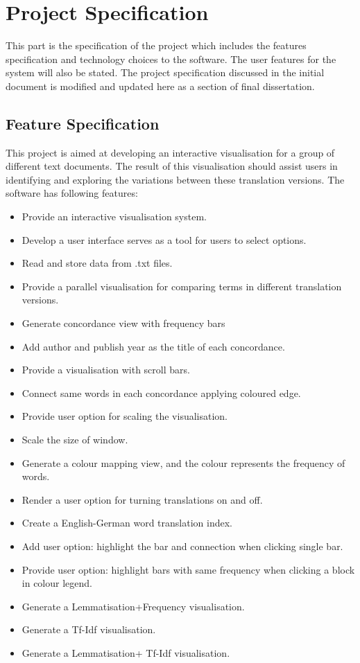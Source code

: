 \clearpage
\section{Project Specification}
This part is the specification of the project which includes the features specification and technology choices to the software. The user features for the system will also be stated. The project specification discussed in the initial document is modified and updated here as a section of final dissertation.

\subsection{Feature Specification}
This project is aimed at developing an interactive visualisation for a group of different text documents. The result of this visualisation should assist users in identifying and exploring the variations between these translation versions. The software has following features:
\begin{itemize}
	\item \textbf{} Provide an interactive visualisation system.
	\item \textbf{} Develop a user interface serves as a tool for users to select options.
	\item \textbf{} Read and store data from .txt files.
	\item \textbf{} Provide a parallel visualisation for comparing terms in different translation versions.
	\item \textbf{} Generate concordance view with frequency bars
	\item \textbf{} Add author and publish year as the title of each concordance.
	\item \textbf{} Provide a visualisation with scroll bars.
	\item \textbf{} Connect same words in each concordance applying coloured edge.
	\item \textbf{} Provide user option for scaling the visualisation.
	\item \textbf{} Scale the size of window.
	\item \textbf{} Generate a colour mapping view, and the colour represents the frequency of words.
	\item \textbf{} Render a user option for turning translations on and off.
	\item \textbf{} Create a English-German word translation index.
	\item \textbf{} Add user option: highlight the bar and connection when clicking single bar.
	\item \textbf{} Provide user option: highlight bars with same frequency when clicking a block in colour legend.
	\item \textbf{} Generate a Lemmatisation+Frequency visualisation.
	\item \textbf{} Generate a Tf-Idf visualisation.
	\item \textbf{} Generate a Lemmatisation+ Tf-Idf visualisation.
\end{itemize}
